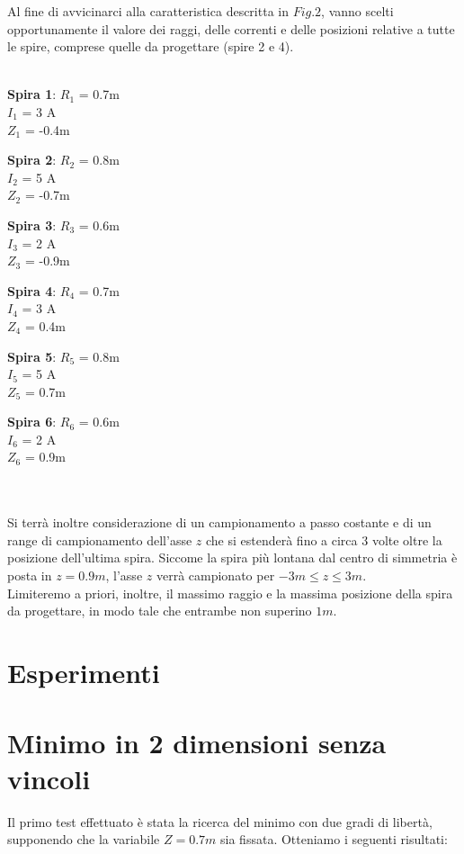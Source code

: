 \documentclass[a4paper, 11pt]{article}
\begin{document}
Al fine di avvicinarci alla caratteristica descritta in $Fig. 2$, vanno scelti
opportunamente il valore dei raggi, delle correnti e delle posizioni relative a
tutte le spire, comprese quelle da progettare (spire 2 e 4). \\ \\
\centerline{ \textbf{Spira 1}: $R_{1}$ = 0.7m \\ $I_{1}$ = 3 A \\ $Z_{1}$ = -0.4m} 
\centerline{ \textbf{Spira 2}: $R_{2}$ = 0.8m \\ $I_{2}$ = 5 A \\ $Z_{2}$ = -0.7m}
\centerline{ \textbf{Spira 3}: $R_{3}$ = 0.6m \\ $I_{3}$ = 2 A \\ $Z_{3}$ = -0.9m}
\centerline{ \textbf{Spira 4}: $R_{4}$ = 0.7m \\ $I_{4}$ = 3 A \\ $Z_{4}$ = 0.4m}
\centerline{ \textbf{Spira 5}: $R_{5}$ = 0.8m \\ $I_{5}$ = 5 A \\ $Z_{5}$ = 0.7m}
\centerline{ \textbf{Spira 6}: $R_{6}$ = 0.6m \\ $I_{6}$ = 2 A \\ $Z_{6}$ = 0.9m}
\\ \\
\noindent
Si terrà inoltre considerazione di un campionamento a passo costante e di un
range di campionamento dell'asse $z$ che si estenderà fino a circa 3 volte oltre
la posizione dell'ultima spira. Siccome la spira più lontana dal centro di
simmetria è posta in $z = 0.9 m$, l'asse $z$ verrà campionato per $-3 m \le z
\le 3 m$. \\
Limiteremo a priori, inoltre, il massimo raggio e la massima posizione della
spira da progettare, in modo tale che entrambe non superino $1 m$.

\section*{Esperimenti}
\section{Minimo in 2 dimensioni senza vincoli}

Il primo test effettuato è stata la ricerca del minimo con due gradi di libertà,
supponendo che la variabile $Z = 0.7m$ sia fissata. Otteniamo i seguenti
risultati:
\end{document}
